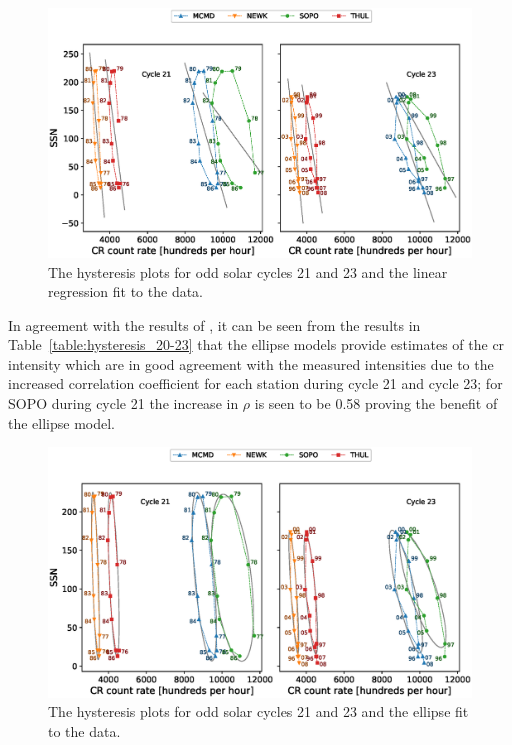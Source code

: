 \begin{figure}
	\includegraphics[width=\columnwidth]{linear_odd.eps}
	\caption{The hysteresis plots for odd solar cycles 21 and 23 and the linear regression fit to the data.}
	\label{fig:linear_odd}
\end{figure}

In agreement with the results of \cite{inceoglu_modeling_2014}, it can be seen from the results in Table~\ref{table:hysteresis_20-23} that the ellipse models provide estimates of the \gls{cr} intensity which are in good agreement with the measured intensities due to the increased correlation coefficient for each station during cycle 21 and cycle 23; for SOPO during cycle 21 the increase in $\rho$ is seen to be 0.58 proving the benefit of the ellipse model.

\begin{figure}
	\includegraphics[width=\columnwidth]{ellipse_odd.eps}
	\caption{The hysteresis plots for odd solar cycles 21 and 23 and the ellipse fit to the data.}
	\label{fig:ellipse_odd}
\end{figure}

